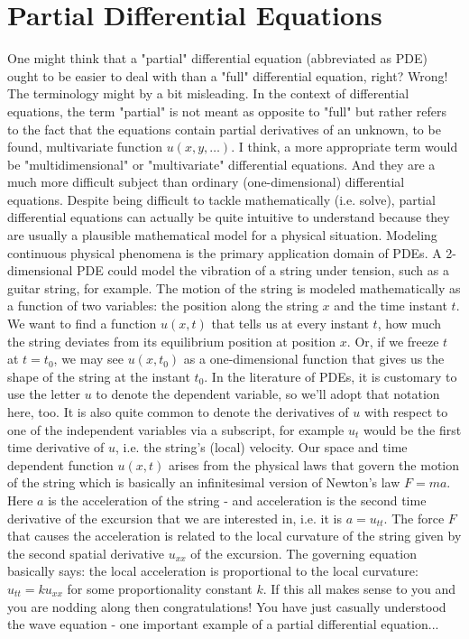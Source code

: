\section{Partial Differential Equations}
One might think that a "partial" differential equation (abbreviated as PDE) ought to be easier to deal with than a "full" differential equation, right? Wrong! The terminology might by a bit misleading. In the context of differential equations, the term "partial" is not meant as opposite to "full" but rather refers to the fact that the equations contain partial derivatives of an unknown, to be found, multivariate function $u(x,y,\ldots)$. I think, a more appropriate term would be "multidimensional" or "multivariate" differential equations. And they are a much more difficult subject than ordinary (one-dimensional) differential equations. Despite being difficult to tackle mathematically (i.e. solve), partial differential equations can actually be quite intuitive to understand because they are usually a plausible mathematical model for a physical situation. Modeling continuous physical phenomena is the primary application domain of PDEs. A 2-dimensional PDE could model the vibration of a string under tension, such as a guitar string, for example. The motion of the string is modeled mathematically as a function of two variables: the position along the string $x$ and the time instant $t$. We want to find a function $u(x,t)$ that tells us at every instant $t$, how much the string deviates from its equilibrium position at position $x$. Or, if we freeze $t$ at $t = t_0$, we may see $u(x, t_0)$ as a one-dimensional function that gives us the shape of the string at the instant $t_0$. In the literature of PDEs, it is customary to use the letter $u$ to denote the dependent variable, so we'll adopt that notation here, too. It is also quite common to denote the derivatives of $u$ with respect to one of the independent variables via a subscript, for example $u_t$ would be the first time derivative of $u$, i.e. the string's (local) velocity. Our space and time dependent function $u(x,t)$ arises from the physical laws that govern the motion of the string which is basically an infinitesimal version of Newton's law $F = m a$. Here $a$ is the acceleration of the string - and acceleration is the second time derivative of the excursion that we are interested in, i.e. it is $a = u_{tt}$. The force $F$ that causes the acceleration is related to the local curvature of the string given by the second spatial derivative $u_{xx}$ of the excursion. The governing equation basically says: the local acceleration is proportional to the local curvature: $u_{tt} = k u_{xx}$ for some proportionality constant $k$. If this all makes sense to you and you are nodding along then congratulations! You have just casually understood the wave equation - one important example of a partial differential equation...



